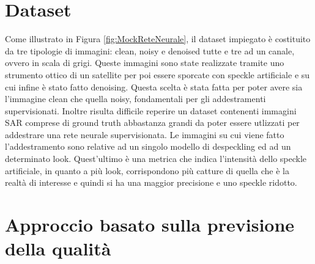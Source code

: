 \section{Dataset}

Come illustrato in Figura \ref{fig:MockReteNeurale}, il dataset impiegato è costituito da tre tipologie di 
immagini: clean, noisy e denoised tutte e tre ad un canale, ovvero in scala di grigi. Queste immagini sono state realizzate tramite uno strumento ottico di un
satellite per poi essere sporcate con speckle artificiale e su cui infine è stato fatto denoising. Questa scelta è stata fatta 
per poter avere sia l'immagine clean che quella noisy, fondamentali per gli addestramenti supervisionati. Inoltre 
risulta difficile reperire un dataset contenenti immagini SAR comprese di ground truth abbastanza grandi da poter essere utlizzati per 
addestrare una rete neurale supervisionata. Le immagini su cui viene fatto l'addestramento sono relative ad un singolo modello di despeckling ed ad 
un determinato look. Quest'ultimo è una metrica che indica l'intensità dello speckle artificiale, in quanto a più look,
corrispondono più catture di quella che è la realtà di interesse e quindi si ha una maggior precisione e uno speckle ridotto.


\section{Approccio basato sulla previsione della qualità}
